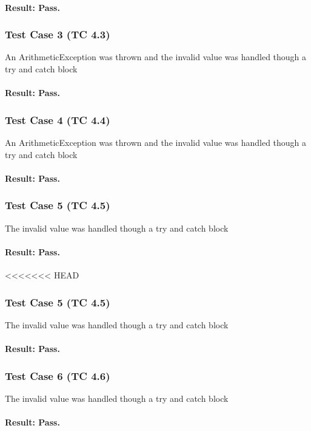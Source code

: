 \documentclass[a4paper,12pt]{article}
\begin{document}
\begin{itemize}
\paragraph{Result: Pass.}

\subsubsection{Test Case 3 (TC 4.3)}
An ArithmeticException was thrown and the invalid value was handled though a try and catch block 

\paragraph{Result: Pass.}
\subsubsection{Test Case 4 (TC 4.4)}
An ArithmeticException was thrown and the invalid value was handled though a try and catch block 

\paragraph{Result: Pass.}

\subsubsection{Test Case 5 (TC 4.5)}
The invalid value was handled though a try and catch block 
\paragraph{Result: Pass.}

<<<<<<< HEAD
\subsubsection{Test Case 5 (TC 4.5)}
The invalid value was handled though a try and catch block 
\paragraph{Result: Pass.}

\subsubsection{Test Case 6 (TC 4.6)}
The invalid value was handled though a try and catch block 
\paragraph{Result: Pass.}



\end{itemize}
\end{document}
